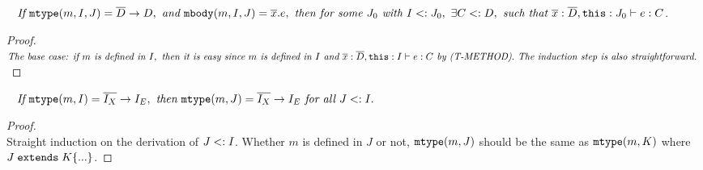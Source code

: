 \begin{lemma}~\label{lemma0}
$\textit{If } \texttt{mtype}(m, I, J) = \overline{D} \rightarrow D, \textit{ and } \texttt{mbody}(m, I, J) = \overline{x}.e, 
 \textit{ then for some } J_0 \textit{ with } I <: J_0, \  \exists C <: D, \textit{ such that }  
 \overline{x}:\overline{D}, \texttt{this}:J_0 \; {\vdash} \; e:C $.

 \begin{proof}~\\
 $\textit{The base case: if } m \textit{ is defined in } I, \textit{ then it is easy since } m 
 \textit{ is defined in } I \textit{ and } 
 \overline{x}:\overline{D}, \texttt{this} : I \; {\vdash} \; e : C \textit{ by (T-METHOD)}.
 \textit{ The induction step is also straightforward. }
 $
 \end{proof}
\end{lemma}


\begin{lemma}~\label{lemma2}
$\textit{If } \texttt{mtype}(m, I) = \overline{I_X} \rightarrow I_E, \textit{ then } \texttt{mtype}(m, J) = \overline{I_X} \rightarrow I_E 
\textit{ for all } J <: I.
$
\begin{proof}~\\
Straight induction on the derivation of $J <: I$. Whether $m$ is defined in $J$ or not, $\texttt{mtype}(m, J)$ should 
be the same as $\texttt{mtype}(m, K)$ where $J \; \texttt{extends} \; K \{...\}$.
\end{proof}
\end{lemma}


